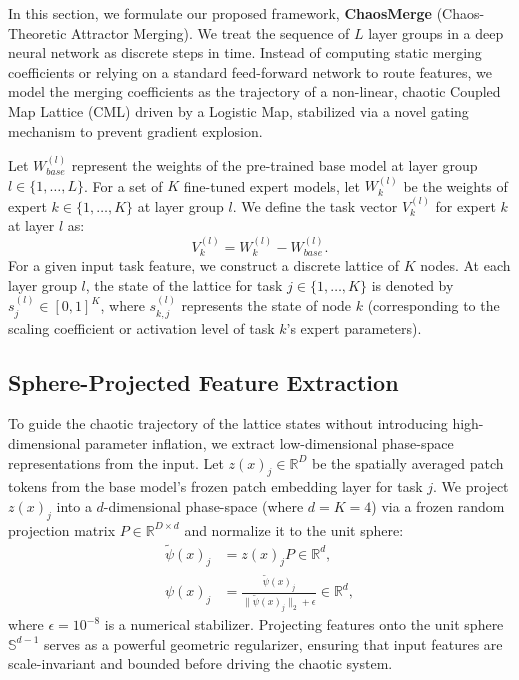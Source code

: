 In this section, we formulate our proposed framework, \textbf{ChaosMerge} (Chaos-Theoretic Attractor Merging). 
We treat the sequence of $L$ layer groups in a deep neural network as discrete steps in time. 
Instead of computing static merging coefficients or relying on a standard feed-forward network to route features, we model the merging coefficients as the trajectory of a non-linear, chaotic Coupled Map Lattice (CML) driven by a Logistic Map, stabilized via a novel gating mechanism to prevent gradient explosion.

Let $W_{base}^{(l)}$ represent the weights of the pre-trained base model at layer group $l \in \{1, \dots, L\}$. 
For a set of $K$ fine-tuned expert models, let $W_k^{(l)}$ be the weights of expert $k \in \{1, \dots, K\}$ at layer group $l$. 
We define the task vector $V_k^{(l)}$ for expert $k$ at layer $l$ as:
\begin{equation}
V_k^{(l)} = W_k^{(l)} - W_{base}^{(l)}.
\end{equation}
For a given input task feature, we construct a discrete lattice of $K$ nodes. 
At each layer group $l$, the state of the lattice for task $j \in \{1, \dots, K\}$ is denoted by $s_j^{(l)} \in [0, 1]^K$, where $s_{k, j}^{(l)}$ represents the state of node $k$ (corresponding to the scaling coefficient or activation level of task $k$'s expert parameters).

\subsection{Sphere-Projected Feature Extraction}
To guide the chaotic trajectory of the lattice states without introducing high-dimensional parameter inflation, we extract low-dimensional phase-space representations from the input. Let $z(x)_j \in \mathbb{R}^D$ be the spatially averaged patch tokens from the base model's frozen patch embedding layer for task $j$. We project $z(x)_j$ into a $d$-dimensional phase-space (where $d = K = 4$) via a frozen random projection matrix $P \in \mathbb{R}^{D \times d}$ and normalize it to the unit sphere:
\begin{align}
\tilde{\psi}(x)_j &= z(x)_j P \in \mathbb{R}^d, \\
\psi(x)_j &= \frac{\tilde{\psi}(x)_j}{\|\tilde{\psi}(x)_j\|_2 + \epsilon} \in \mathbb{R}^d,
\end{align}
where $\epsilon = 10^{-8}$ is a numerical stabilizer. Projecting features onto the unit sphere $\mathbb{S}^{d-1}$ serves as a powerful geometric regularizer, ensuring that input features are scale-invariant and bounded before driving the chaotic system.

